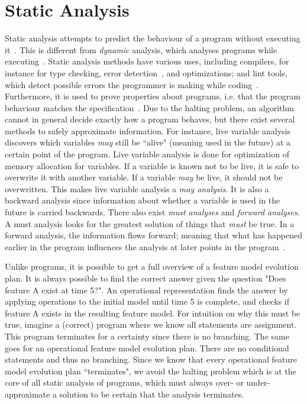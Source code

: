 \section{Static Analysis}
\label{sec:static-analysis}

Static analysis attempts to predict the behaviour of a program without executing it~\cite{book:principles-of-program-analysis}. This is different from \emph{dynamic} analysis, which analyses programs while executing~\cite{art:a-survey-on-static-analysis-and-model-checking}. Static analysis methods have various uses, including compilers, for instance for type checking, error detection~\cite{art:a-survey-on-automated-dynamic-malware-analysis-techniques-and-tools}, and optimizations; and lint tools, which detect possible errors the programmer is making while coding~\cite{art:industrial-perspective-on-static-analysis}. Furthermore, it is used to prove properties about programs, i.e. that the program behaviour matches the specification~\cite{art:a-survey-on-static-analysis-and-model-checking}. Due to the halting problem, an algorithm cannot in general decide exactly how a program behaves, but there exist several methods to safely approximate information. For instance, live variable analysis discovers which variables \emph{may} still be ``alive" (meaning used in the future) at a certain point of the program. Live variable analysis is done for optimization of memory allocation for variables. If a variable is known not to be live, it is safe to overwrite it with another variable. If a variable \emph{may} be live, it should not be overwritten. This makes live variable analysis a \emph{may analysis}. It is also a backward analysis since information about whether a variable is used in the future is carried backwards. There also exist \emph{must analyses} and \emph{forward analyses}. A must analysis looks for the greatest solution of things that \emph{must} be true. In a forward analysis, the information flows forward; meaning that what has happened earlier in the program influences the analysis at later points in the program~\cite{book:principles-of-program-analysis}.

Unlike programs, it is possible to get a full overview of a feature model evolution plan. It is always possible to find the correct answer given the question "Does feature A exist at time 5?". An operational representation finds the answer by applying operations to the initial model until time 5 is complete, and checks if feature A exists in the resulting feature model. For intuition on why this must be true, imagine a (correct) program where we know all statements are assignment. This program terminates for a certainty since there is no branching. The same goes for an operational feature model evolution plan. There are no conditional statements and thus no branching. Since we know that every operational feature model evolution plan ``terminates", we avoid the halting problem which is at the core of all static analysis of programs, which must always over- or under-approximate a solution to be certain that the analysis terminates.

